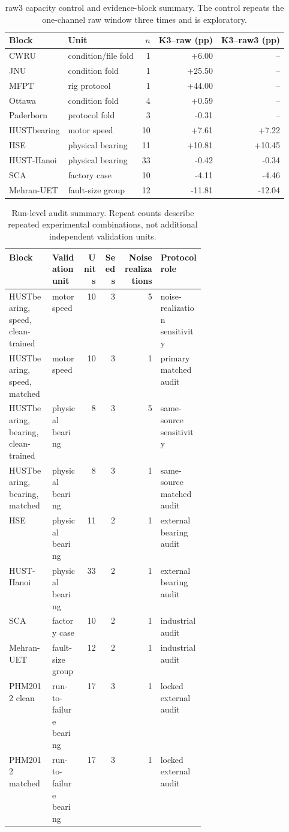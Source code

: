 \documentclass[11pt]{article}
\begin{document}
\begin{table}[t]
\centering
\caption{raw3 capacity control and evidence-block summary. The control repeats
the one-channel raw window three times and is exploratory.}
\label{tab:raw3-capacity}
\scriptsize
\begin{tabular}{@{}llrrr@{}}
\toprule
Block & Unit & $n$ & K3--raw (pp) & K3--raw3 (pp) \\
\midrule
CWRU & condition/file fold & 1 & +6.00 & -- \\
JNU & condition fold & 1 & +25.50 & -- \\
MFPT & rig protocol & 1 & +44.00 & -- \\
Ottawa & condition fold & 4 & +0.59 & -- \\
Paderborn & protocol fold & 3 & -0.31 & -- \\
HUSTbearing & motor speed & 10 & +7.61 & +7.22 \\
HSE & physical bearing & 11 & +10.81 & +10.45 \\
HUST-Hanoi & physical bearing & 33 & -0.42 & -0.34 \\
SCA & factory case & 10 & -4.11 & -4.46 \\
Mehran-UET & fault-size group & 12 & -11.81 & -12.04 \\
\bottomrule
\end{tabular}
\end{table}

\begin{table}[t]
\centering
\caption{Run-level audit summary. Repeat counts describe repeated experimental
combinations, not additional independent validation units.}
\label{tab:run-level}
\footnotesize
\begin{tabularx}{\linewidth}{@{}>{\raggedright\arraybackslash}p{0.22\linewidth}>{\raggedright\arraybackslash}p{0.16\linewidth}rrrX@{}}
\toprule
Block & Validation unit & Units & Seeds & Noise realizations & Protocol role \\
\midrule
HUSTbearing, speed, clean-trained & motor speed & 10 & 3 & 5 & noise-realization sensitivity \\
HUSTbearing, speed, matched & motor speed & 10 & 3 & 1 & primary matched audit \\
HUSTbearing, bearing, clean-trained & physical bearing & 8 & 3 & 5 & same-source sensitivity \\
HUSTbearing, bearing, matched & physical bearing & 8 & 3 & 1 & same-source matched audit \\
HSE & physical bearing & 11 & 2 & 1 & external bearing audit \\
HUST-Hanoi & physical bearing & 33 & 2 & 1 & external bearing audit \\
SCA & factory case & 10 & 2 & 1 & industrial audit \\
Mehran-UET & fault-size group & 12 & 2 & 1 & industrial audit \\
PHM2012 clean & run-to-failure bearing & 17 & 3 & 1 & locked external audit \\
PHM2012 matched & run-to-failure bearing & 17 & 3 & 1 & locked external audit \\
\bottomrule
\end{tabularx}
\end{table}
\end{document}

